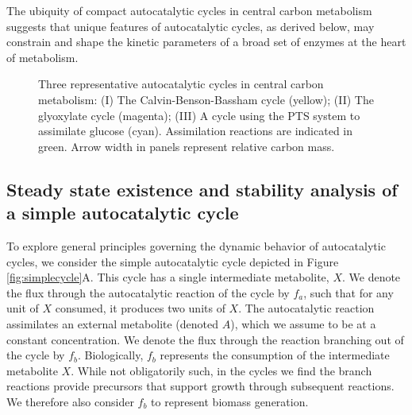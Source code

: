 The ubiquity of compact autocatalytic cycles in central carbon metabolism suggests that unique features of autocatalytic cycles, as derived below, may constrain and shape the kinetic parameters of a broad set of enzymes at the heart of metabolism.

\begin{figure}[!htb]
\resizebox{1\linewidth}{!}{
  
}
\caption{
    \label{fig:realautocatal}
Three representative autocatalytic cycles in central carbon metabolism: (I) The Calvin-Benson-Bassham cycle (yellow); (II) The glyoxylate cycle (magenta); (III) A cycle using the PTS system to assimilate glucose (cyan).
Assimilation reactions are indicated in green.
Arrow width in panels represent relative carbon mass.
}
\end{figure}

\subsection{Steady state existence and stability analysis of a simple autocatalytic cycle}
To explore general principles governing the dynamic behavior of autocatalytic cycles, we consider the simple autocatalytic cycle depicted in Figure \ref{fig:simplecycle}A.
This cycle has a single intermediate metabolite, $X$.
We denote the flux through the autocatalytic reaction of the cycle by $f_a$, such that for any unit of $X$ consumed, it produces two units of $X$.
The autocatalytic reaction assimilates an external metabolite (denoted $A$), which we assume to be at a constant concentration.
We denote the flux through the reaction branching out of the cycle by $f_b$.
Biologically, $f_b$ represents the consumption of the intermediate metabolite $X$.
While not obligatorily such, in the cycles we find the branch reactions provide precursors that support growth through subsequent reactions.
We therefore also consider $f_b$ to represent biomass generation.

